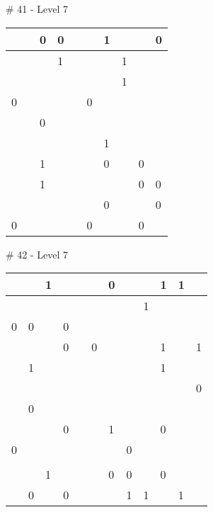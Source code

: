 \# 41 - Level 7 \newline
\begin{tabular}{|m{\collen}|m{\collen}|m{\collen}|m{\collen}|m{\collen}|m{\collen}|m{\collen}|m{\collen}|m{\collen}|m{\collen}|}
\hline
    &   & 0 & 0 &   &   & 1 &   &   & 0 \\
\hline
    &   &   & 1 &   &   &   & 1 &   &   \\
\hline
    &   &   &   &   &   &   & 1 &   &   \\
\hline
  0 &   &   &   &   & 0 &   &   &   &   \\
\hline
    &   & 0 &   &   &   &   &   &   &   \\
\hline
    &   &   &   &   &   & 1 &   &   &   \\
\hline
    &   & 1 &   &   &   & 0 &   & 0 &   \\
\hline
    &   & 1 &   &   &   &   &   & 0 & 0 \\
\hline
    &   &   &   &   &   & 0 &   &   & 0 \\
\hline
  0 &   &   &   &   & 0 &   &   & 0 &   \\
\hline
\end{tabular}


\medskip

\# 42 - Level 7 \newline
\begin{tabular}{|m{\collen}|m{\collen}|m{\collen}|m{\collen}|m{\collen}|m{\collen}|m{\collen}|m{\collen}|m{\collen}|m{\collen}|m{\collen}|m{\collen}|}
\hline
    &   & 1 &   &   &   & 0 &   &   & 1 & 1 &   \\
\hline
    &   &   &   &   &   &   &   & 1 &   &   &   \\
\hline
  0 & 0 &   & 0 &   &   &   &   &   &   &   &   \\
\hline
    &   &   & 0 &   & 0 &   &   &   & 1 &   & 1 \\
\hline
    & 1 &   &   &   &   &   &   &   & 1 &   &   \\
\hline
    &   &   &   &   &   &   &   &   &   &   & 0 \\
\hline
    & 0 &   &   &   &   &   &   &   &   &   &   \\
\hline
    &   &   & 0 &   &   & 1 &   &   & 0 &   &   \\
\hline
  0 &   &   &   &   &   &   & 0 &   &   &   &   \\
\hline
    &   &   &   &   &   &   &   &   &   &   &   \\
\hline
    &   & 1 &   &   &   & 0 & 0 &   & 0 &   &   \\
\hline
    & 0 &   & 0 &   &   &   & 1 & 1 &   & 1 &   \\
\hline
\end{tabular}


